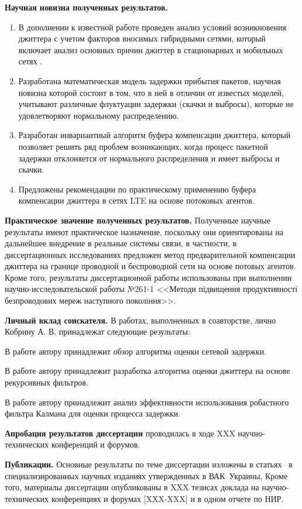 \textbf{Научная новизна полученных результатов.} 
\begin{enumerate}
  \item В дополнении к известной работе \cite{clark} проведен анализ условий возникновения джиттера с учетом факторов вносимых гибридными сетями, который включает анализ основных причин джиттер в стационарных и мобильных сетях .
  \item Разработана математическая модель задержки прибытия пакетов, научная новизна которой состоит в том, что в ней в отличии от известых моделей, учитывают различные флуктуации задержки (скачки и выбросы), которые не удовлетворяют нормальному распределению.
  \item Разработан инвариантный алгоритм буфера компенсации джиттера, который позволяет решить ряд проблем возникающих, когда процесс пакетной задержки отклоняется от нормального распределения и имеет выбросы и скачки.
  \item Предложены рекомендации по практическому применению буфера компенсации джиттера в сетях LTE на основе потоковых агентов.
\end{enumerate}

\textbf{Практическое значение полученных результатов.} Полученные научные результаты имеют практическое назначение, поскольку они ориентированы на дальнейшее внедрение в реальные системы связи, в частности, в диссертационных исследованиях предложен метод предварительной компенсации джиттера на границе проводной и беспроводной сети на основе потовых агентов.
Кроме того, результаты диссертационной работы использованы при выполнении научно-исследовательской работы №261-1 <<Методи підвищення продуктивності безпроводових мереж наступного покоління>>.


\textbf{Личный вклад соискателя.} В работах, выполненных в соавторстве, лично Кобрину А. В. принадлежат следующие результаты: 

В работе \cite{my1} автору принадлежит обзор алгоритма оценки сетевой задержки.

В работе \cite{my2} автору принадлежит разработка алгоритма оценки джиттера на основе рекурсивных фильтров.

В работе \cite{my4} автору принадлежит анализ эффективности использования робастного фильтра Калмана для оценки процесса задержки.

\textbf{Апробация результатов диссертации} проводилась в ходе XXX научно-технических конференций и форумов. 


\textbf{Публикации.} Основные результаты по теме диссертации изложены в статьях~\cite{my1,my2,my3,my4,my5} в специализированных научных изданиях утвержденных в ВАК~Украины, Кроме того, материалы диссертации опубликованы в XXX тезисах доклада на научно-технических конференциях и форумах [XXX-XXX] и в одном отчете по НИР.


\clearpage